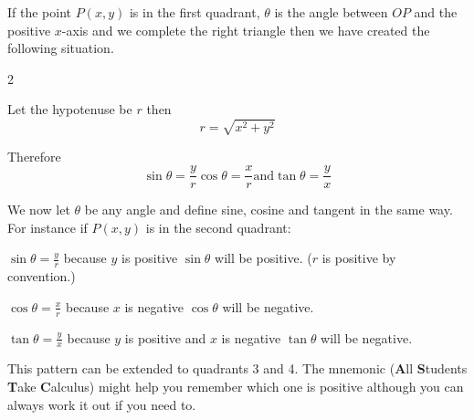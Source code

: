 If the point $P (x ,y)$ is in the first quadrant, $\theta $ is the angle between $OP$ and the positive $x$-axis and we complete the right triangle then we have created the following situation.  
\columnsep =30pt
\begin {multicols}{2}
 

   
\setlength\fboxrule{0in}\setlength\fboxsep{0.2in}


Let the hypotenuse be $r$ then
\begin{equation*}r =\sqrt{x^{2} +y^{2}}
\end{equation*}


\end {multicols}


Therefore
\begin{equation*}\sin  \theta  =\frac{y}{r}\text{}\cos  \theta  =\frac{x}{r}\text{and}\tan  \theta  =\frac{y}{x}
\end{equation*}

We now let $\theta $ be any angle and define sine, cosine and tangent in the same way. For instance
if $P (x ,y)$ is in the second quadrant: 

   
\setlength\fboxrule{0in}\setlength\fboxsep{0.2in}


$\sin  \theta  =\frac{y}{r}$ because $y$ is positive $\sin  \theta $ will be positive. ($r$ is positive by convention.) 

$\cos  \theta  =\frac{x}{r}$ because $x$ is negative $\cos  \theta $ will be negative. 

$\tan  \theta  =\frac{y}{x}$ because $y$ is positive and $x$ is negative $\tan  \theta $ will be negative. 

This pattern can be extended to quadrants 3 and 4. The
mnemonic (\textbf{A}ll \textbf{S}tudents \textbf{T}ake \textbf{C}alculus) might help you remember which one is positive
although you can always work it out if you need to. 

